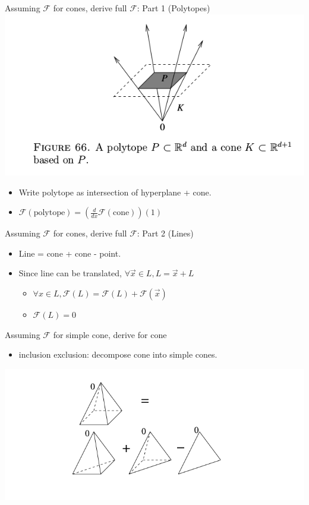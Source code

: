 \documentclass[presentation]{beamer}
\begin{document}
\begin{frame}[label=sec-3]{Assuming $\mathcal{F}$ for cones, derive full $\mathcal{F}$: Part 1 (Polytopes)}
\includegraphics[width=.9\linewidth]{./res/polytope-as-cross-section-of-cone.png}
\begin{itemize}
\item Write polytope as intersection of hyperplane + cone.
\item $\mathcal{F}(\text{polytope}) = (\frac{d}{dx} \mathcal{F}(\text{cone}))(1)$
\end{itemize}
\end{frame}

\begin{frame}[label=sec-4]{Assuming $\mathcal{F}$ for cones, derive full $\mathcal{F}$: Part 2 (Lines)}
\begin{itemize}
\item Line = cone + cone - point.
\item Since line can be translated, $\forall \vec{x} \in L, L = \vec{x} + L$
\begin{itemize}
\item $\forall x \in L, \mathcal{F}(L) = \mathcal{F}(L) + \mathcal{F}(\vec{x})$
\item $\mathcal{F}(L) = 0$
\end{itemize}
\end{itemize}
\end{frame}


\begin{frame}[label=sec-5]{Assuming $\mathcal{F}$ for simple cone, derive for cone}
\begin{itemize}
\item inclusion exclusion: decompose cone into simple cones.
\end{itemize}
\includegraphics[width=.9\linewidth]{./res/cut-cone-into-simple-cones.png}
\end{frame}
\end{document}
